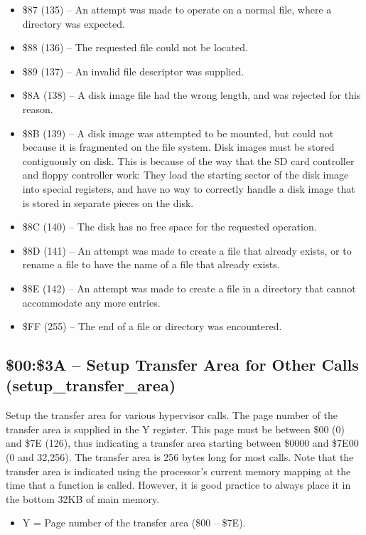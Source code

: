 \begin{itemize}
\item \$87 (135) -- An attempt was made to operate on a normal file, where a directory was expected.
\item \$88 (136) -- The requested file could not be located.
\item \$89 (137) -- An invalid file descriptor was supplied.
\item \$8A (138) -- A disk image file had the wrong length, and was rejected for this reason.
\item \$8B (139) -- A disk image was attempted to be mounted, but could not because it is fragmented on the file system.  Disk images must be stored contiguously on disk. This is because of the way that the SD card controller and floppy controller work: They load the starting sector of the disk image into special registers, and have no way to correctly handle a disk image that is stored in separate pieces on the disk. 
\item \$8C (140) -- The disk has no free space for the requested operation.
\item \$8D (141) -- An attempt was made to create a file that already exists, or to rename a file to have the name of a file that already exists.
\item \$8E (142) -- An attempt was made to create a file in a directory that cannot accommodate any more entries.
\item \$FF (255) -- The end of a file or directory was encountered.
\end{itemize}

\subsection{\$00:\$3A -- Setup Transfer Area for Other Calls (setup\_transfer\_area)}

Setup the transfer area for various hypervisor calls. The page number of the transfer area is supplied in the Y register.
This page must be between \$00 (0) and \$7E (126), thus indicating a transfer area starting between \$0000 and \$7E00 (0 and 32,256).
The transfer area is
256 bytes long for most calls.  Note that the transfer area is indicated using the processor's current memory mapping at
the time that a function is called.  However, it is good practice to always place it in the bottom 32KB of main memory.

\begin{itemize}
  \item Y = Page number of the transfer area (\$00 -- \$7E).
\end{itemize}

